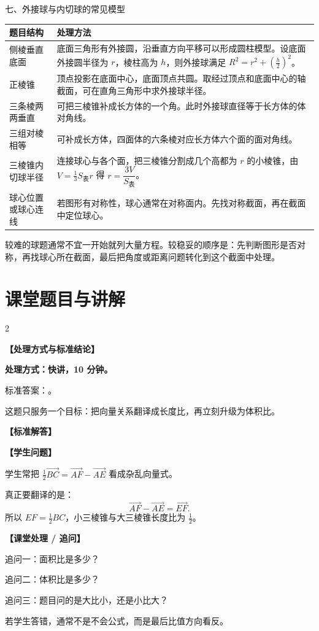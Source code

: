 \documentclass[11pt,a4paper]{ctexart}
\newcommand{\teachblock}[2]{%
  \par\addvspace{0.55em}%
  \noindent\textbf{【#1】}\par\nobreak
  \begingroup
    \raggedright
    \setlength{\parskip}{0.35em}%
    #2\par
  \endgroup
}
\newcommand{\topicteacherproblem}[2]{%
  \teachquestionheader{#1\quad #2}
}
\begin{document}
\begin{teachbox}{七、外接球与内切球的常见模型}
\renewcommand{\arraystretch}{1.35}
\begin{tabularx}{\textwidth}{p{3.2cm}X}
\toprule
题目结构 & 处理方法 \\
\midrule
侧棱垂直底面 & 底面三角形有外接圆，沿垂直方向平移可以形成圆柱模型。设底面外接圆半径为 \(r\)，棱柱高为 \(h\)，则外接球满足 \(R^2=r^2+\left(\frac h2\right)^2\)。\\ \hline
正棱锥 & 顶点投影在底面中心，底面顶点共圆。取经过顶点和底面中心的轴截面，可在直角三角形中求外接球半径。\\ \hline
三条棱两两垂直 & 可把三棱锥补成长方体的一个角。此时外接球直径等于长方体的体对角线。\\ \hline
三组对棱相等 & 可补成长方体，四面体的六条棱对应长方体六个面的面对角线。\\ \hline
三棱锥内切球半径 & 连接球心与各个面，把三棱锥分割成几个高都为 \(r\) 的小棱锥，由 \(V=\frac13S_{\text{表}}r\) 得 \(r=\dfrac{3V}{S_{\text{表}}}\)。\\ \hline
球心位置或球心连线 & 若图形有对称性，球心通常在对称面内。先找对称截面，再在截面中定位球心。\\
\bottomrule
\end{tabularx}

较难的球题通常不宜一开始就列大量方程。较稳妥的顺序是：先判断图形是否对称，再找球心所在截面，最后把角度或距离问题转化到这个截面中处理。
\end{teachbox}

\newpage
\section{课堂题目与讲解}

\topicteacherproblem{检测 1}{平行截面与体积比}
{\small \qSolidTetrahedronVolStem}
\qSolidTetrahedronVolOptions
\begin{center}
  \qSolidTetrahedronVolFigure[1.2]
\end{center}

\begin{paracol}{2}
\teachblock{处理方式与标准结论}{
  \textbf{处理方式：快讲，10 分钟。}

  标准答案：\qSolidTetrahedronVolAnswer。

  这题只服务一个目标：把向量关系翻译成长度比，再立刻升级为体积比。
}

\teachblock{标准解答}{
  \qSolidTetrahedronVolSolution
}

\switchcolumn
\teachblock{学生问题}{
  学生常把 \(\frac12\vec{BC}=\vec{AF}-\vec{AE}\) 看成杂乱向量式。

  真正要翻译的是：
  \[
    \vec{AF}-\vec{AE}=\vec{EF}.
  \]
  所以 \(EF=\frac12BC\)，小三棱锥与大三棱锥长度比为 \(\frac12\)。
}

\teachblock{课堂处理 / 追问}{
  追问一：面积比是多少？

  追问二：体积比是多少？

  追问三：题目问的是大比小，还是小比大？

  若学生答错，通常不是不会公式，而是最后比值方向看反。
}
\end{paracol}
\end{document}
